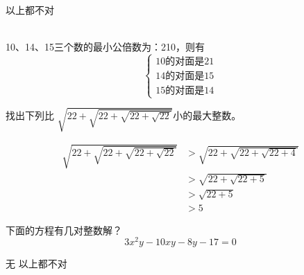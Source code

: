 \documentclass[answers]{exam}
\begin{document}
\begin{questions}
	\begin{oneparchoices}
		    \choice 以上都不对
	\end{oneparchoices}
	\begin{solution}\\
		10、14、15三个数的最小公倍数为：210，则有
		\begin{equation*}
			\begin{cases}
				10\text{的对面是} 21 \\
				14\text{的对面是} 15 \\
				15\text{的对面是} 14
			\end{cases}
		\end{equation*}
	\end{solution}

	\question 找出下列比 \( \displaystyle \sqrt{22 + \sqrt{22 + \sqrt{22 + \sqrt{22}}}} \)小的最大整数。

	\begin{oneparchoices}
		    \choice 25
	\end{oneparchoices}
	\begin{solution}
		\begin{align*}
			\sqrt{22 + \sqrt{22 + \sqrt{22 + \sqrt{22}}}} & > \sqrt{22 + \sqrt{22 + \sqrt{22 + 4}}} \\
			                                              & > \sqrt{22 + \sqrt{22 + 5}}             \\
			                                              & > \sqrt{22 + 5}                         \\
			                                              & > 5
		\end{align*}
	\end{solution}

	\question 下面的方程有几对整数解？
	\begin{equation}
		3x^2y - 10xy - 8y - 17 = 0
	\end{equation}
	\begin{oneparchoices}
		\choice 无    \choice 以上都不对
	\end{oneparchoices}


\end{questions}
\end{document}
